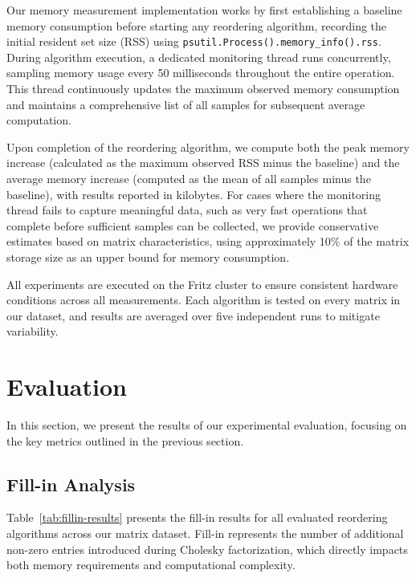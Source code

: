 Our memory measurement implementation works by first establishing a baseline memory consumption before starting any reordering algorithm, recording the initial resident set size (RSS) using \texttt{psutil.Process().memory\_info().rss}. During algorithm execution, a dedicated monitoring thread runs concurrently, sampling memory usage every 50 milliseconds throughout the entire operation. This thread continuously updates the maximum observed memory consumption and maintains a comprehensive list of all samples for subsequent average computation.

Upon completion of the reordering algorithm, we compute both the peak memory increase (calculated as the maximum observed RSS minus the baseline) and the average memory increase (computed as the mean of all samples minus the baseline), with results reported in kilobytes. For cases where the monitoring thread fails to capture meaningful data, such as very fast operations that complete before sufficient samples can be collected, we provide conservative estimates based on matrix characteristics, using approximately 10\% of the matrix storage size as an upper bound for memory consumption.

All experiments are executed on the Fritz cluster to ensure consistent hardware conditions across all measurements. Each algorithm is tested on every matrix in our dataset, and results are averaged over five independent runs to mitigate variability. 

\section{Evaluation}

In this section, we present the results of our experimental evaluation, focusing on the key metrics outlined in the previous section. 

\subsection{Fill-in Analysis}

Table~\ref{tab:fillin-results} presents the fill-in results for all evaluated reordering algorithms across our matrix dataset. Fill-in represents the number of additional non-zero entries introduced during Cholesky factorization, which directly impacts both memory requirements and computational complexity.

